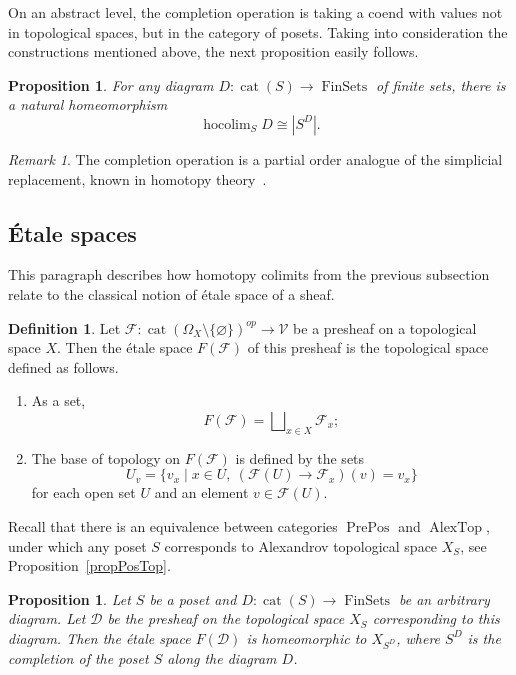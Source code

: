 \documentclass[english,12pt,oneside]{amsproc}
\DeclareMathOperator{\cat}{cat}
\DeclareMathOperator{\PrePos}{PrePos}
\DeclareMathOperator{\AlexTop}{AlexTop}
\DeclareMathOperator{\FinSets}{FinSets}
\DeclareMathOperator{\hocolim}{hocolim}
\newcommand{\ca}[1]{\mathcal{#1}}
\newcommand{\Vv}{\mathcal{V}}
\newcounter{stmcounter}[section]
\numberwithin{equation}{section}
\theoremstyle{plain}
\newtheorem{prop}[stmcounter]{Proposition}
\theoremstyle{definition}
\newtheorem{defin}[stmcounter]{Definition}
\theoremstyle{remark}
\newtheorem{rem}[stmcounter]{Remark}
\begin{document}
On an abstract level, the completion operation is taking a coend with values not in topological spaces, but in the category of posets.
Taking into consideration the constructions mentioned above, the next proposition easily follows.

\begin{prop}\label{proHocolim}
For any diagram $D\colon\cat(S)\to\FinSets$ of finite sets, there is a natural homeomorphism
\[
\hocolim_SD\cong |S^D|.
\]
\end{prop}

\begin{rem}
The completion operation is a partial order analogue of the simplicial replacement, known in homotopy theory~\cite{Dugger}.
\end{rem}

\subsection{Étale spaces}\label{etalespaces}

This paragraph describes how homotopy colimits from the previous subsection relate to the classical notion of étale space of a sheaf.

\begin{defin}
Let $\ca{F}\colon \cat(\Omega_X\setminus\{\varnothing\})^{op}\to \Vv$ be a presheaf on a topological space $X$. Then the étale space $F(\ca{F})$ of this presheaf is the topological space defined as follows.
\begin{enumerate}
    \item As a set,
    \[
    F(\ca{F}) = \bigsqcup\nolimits_{x\in X}\ca{F}_x;
    \]
    \item The base of topology on $F(\ca{F})$ is defined by the sets
    \[
    U_v = \{v_x\mid x\in U,\: (\ca{F}(U)\to \ca{F}_x)(v) = v_x\}
    \]
    for each open set $U$ and an element $v\in \ca{F}(U)$.
\end{enumerate}
\end{defin}

Recall that there is an equivalence between categories $\PrePos$ and $\AlexTop$, under which any poset $S$ corresponds to Alexandrov topological space $X_S$, see Proposition~\ref{propPosTop}.

\begin{prop}\label{etaleequiv}
    Let $S$ be a poset  and  $D\colon \cat(S)\to \FinSets$ be an arbitrary diagram. Let $\ca{D}$ be the presheaf on the topological space $X_S$ corresponding to this diagram. Then the étale space $F(\ca{D})$ is homeomorphic to $X_{S^D}$, where $S^{D}$ is the completion of the poset $S$ along the diagram $D$.
\end{prop}
\end{document}
